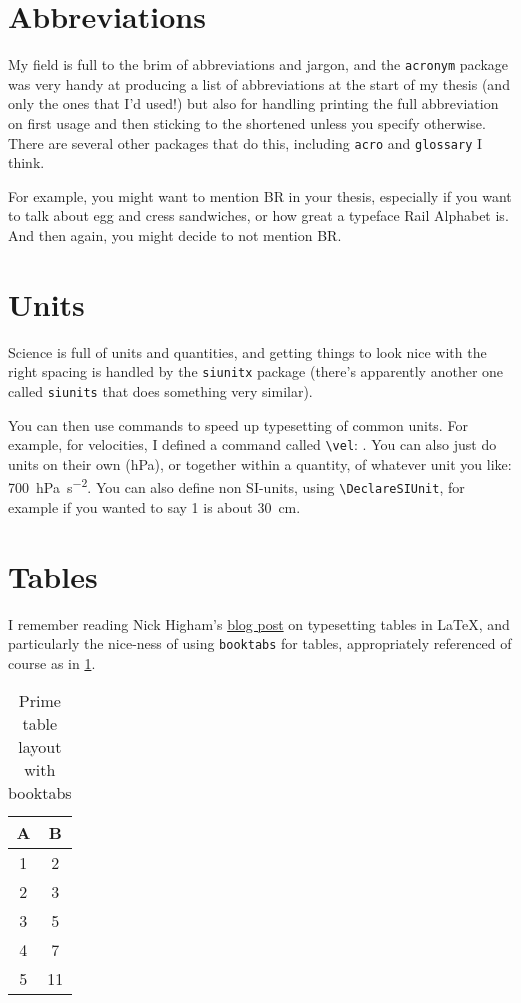 \section{Abbreviations}
My field is full to the brim of abbreviations and jargon, and the \verb|acronym| package was very handy at producing a list of abbreviations at the start of my thesis (and only the ones that I'd used!) but also for handling printing the full abbreviation on first usage and then sticking to the shortened unless you specify otherwise. There are several other packages that do this, including \verb|acro| and \verb|glossary| I think.

For example, you might want to mention \ac{BR} in your thesis, especially if you want to talk about egg and cress sandwiches, or how great a typeface Rail Alphabet is. And then again, you might decide to not mention \ac{BR}.

\section{Units}

Science is full of units and quantities, and getting things to look nice with the right spacing is handled by the \verb|siunitx| package (there's apparently another one called \verb|siunits| that does something very similar). 

You can then use commands to speed up typesetting of common units. For example, for velocities, I defined a command called \verb|\vel|: . You can also just do units on their own (\unit{\hecto\pascal}), or together within a quantity, of whatever unit you like: \qty{700}{\hecto\pascal\per\second\squared}. You can also define non SI-units, using \verb|\DeclareSIUnit|, for example if you wanted to say \qty{1}{\foot} is about \qty{30}{\cm}.

\section{Tables}

I remember reading Nick Higham's \href{https://nhigham.com/2019/11/19/better-latex-tables-with-booktabs/}{blog post} on typesetting tables in \LaTeX, and particularly the nice-ness of using \verb|booktabs| for tables, appropriately referenced of course as in \cref{tab:book1}.

\begin{table}
    \centering
    \begin{tabular}{cc}
    \toprule
     A    & B \\
     \midrule
     1 & 2\\
     2 & 3\\
     3 & 5\\
     4 & 7\\
     5 & 11\\
     \bottomrule
    \end{tabular}
    \caption{Prime table layout with booktabs}
    \label{tab:book1}
\end{table}

